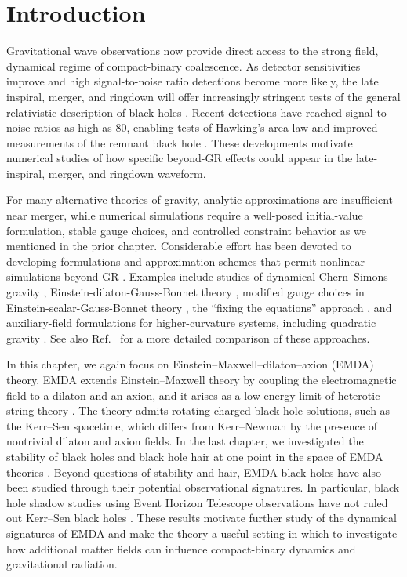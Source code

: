 \section{Introduction}

Gravitational wave observations now provide direct access to the strong field, dynamical regime of compact-binary coalescence. As detector sensitivities improve and high signal-to-noise ratio detections become more likely, the late inspiral, merger, and ringdown will offer increasingly stringent tests of the general relativistic description of black holes \cite{Abbott2025GWTC3GR,Yunes2025GWTests,Yagi2016_BHTestsGR,Berti2015,Abac2025GW250114}. Recent detections have reached signal-to-noise ratios as high as $80$, enabling tests of Hawking's area law and improved measurements of the remnant black hole \cite{LVK2025GW250114}. These developments motivate numerical studies of how specific beyond-GR effects could appear in the late-inspiral, merger, and ringdown waveform.

For many alternative theories of gravity, analytic approximations are insufficient near merger, while numerical simulations require a well-posed initial-value formulation, stable gauge choices, and controlled constraint behavior as we mentioned in the prior chapter. Considerable effort has been devoted to developing formulations and approximation schemes that permit nonlinear simulations beyond GR \cite{Cardoso2012NRHEP,Afshordi2024BlackHolesInsideOut,Bambi2025Mimickers,Bernard2025GenericEFTGWTests}. Examples include studies of dynamical Chern--Simons gravity \cite{Alexander2009,Okounkova2019}, Einstein-dilaton-Gauss-Bonnet theory \cite{Okounkova:2020rqw,Okounkova2020}, modified gauge choices in Einstein-scalar-Gauss-Bonnet theory \cite{Ripley2020a,Ripley2020b}, the ``fixing the equations'' approach \cite{Cayuso2020}, and auxiliary-field formulations for higher-curvature systems, including quadratic gravity \cite{Held2021,Held2023,Held2025,East2023,Taillte2025}. See also Ref.~\cite{Corman2024} for a more detailed comparison of these approaches.

In this chapter, we again focus on Einstein--Maxwell--dilaton--axion (EMDA) theory. EMDA extends Einstein--Maxwell theory by coupling the electromagnetic field to a dilaton and an axion, and it arises as a low-energy limit of heterotic string theory \cite{Sen1992,Sen1995}. The theory admits rotating charged black hole solutions, such as the Kerr--Sen spacetime, which differs from Kerr--Newman by the presence of nontrivial dilaton and axion fields. In the last chapter, we investigated the stability of black holes and black hole hair at one point in the space of EMDA theories \cite{PopeRohrerWhiting2025,Carroll2026KerrSenStability}. Beyond questions of stability and hair, EMDA black holes have also been studied through their potential observational signatures. In particular, black hole shadow studies using Event Horizon Telescope observations have not ruled out Kerr--Sen black holes \cite{Sahoo2024PRD,Sahoo2025}. These results motivate further study of the dynamical signatures of EMDA and make the theory a useful setting in which to investigate how additional matter fields can influence compact-binary dynamics and gravitational radiation.

